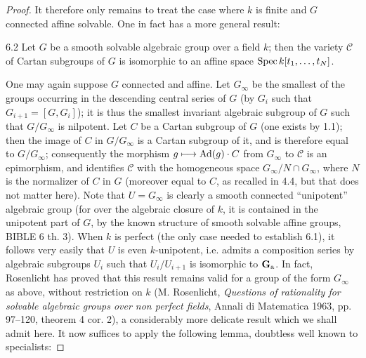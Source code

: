 \begin{proof}
It therefore only remains to treat the
case where $k$ is finite and $G$
connected affine solvable. One in
fact has a more general result:
\begin{corollary}{6.2}\label{XIV.6.2}
Let $G$ be a smooth solvable
algebraic group over a field $k$;
then the variety $\mathscr C$ of
Cartan subgroups of $G$ is
isomorphic to an affine space
$\operatorname{Spec} k[t_1,\ldots,t_N]$.
\end{corollary}
One may again suppose $G$ connected
and affine. Let $G_\infty$ be the
smallest of the groups occurring
in the descending central series
of $G$ (by $G_i$ such that
$G_{i+1}=[G,G_i]$); it is thus
the smallest invariant algebraic
subgroup of $G$ such that
$G/G_\infty$ is nilpotent.
Let $C$ be a Cartan subgroup of
$G$ (one exists by 1.1); then
the image of $C$ in $G/G_\infty$
is a Cartan subgroup of it,
and is therefore equal to
$G/G_\infty$; consequently the
morphism $g\longmapsto\operatorname{Ad}(g)\cdot C$
from $G_\infty$ to $\mathscr C$
is an epimorphism, and identifies
$\mathscr C$ with the homogeneous
space $G_\infty/N\cap G_\infty$,
where $N$ is the normalizer
of $C$ in $G$ (moreover equal
to $C$, as recalled in 4.4,
but that does not matter here).
Note that $U=G_\infty$ is
clearly a smooth connected
``unipotent'' algebraic group
(for over the algebraic closure
of $k$, it is contained in
the unipotent part of $G$,
by the known structure of
smooth solvable affine groups,
BIBLE 6 th. 3). When $k$ is
perfect (the only case needed
to establish 6.1), it follows
very easily that $U$ is even
$k$-unipotent, i.e. admits a
composition series by algebraic
subgroups $U_i$ such that
$U_i/U_{i+1}$ is isomorphic
to $\mathbf{G}_{\mathrm{a}}$. In fact, Rosenlicht
has proved that this result
remains valid for a group
of the form $G_\infty$ as
above, without restriction
on $k$ (M. Rosenlicht,
\emph{Questions of rationality
for solvable algebraic groups
over non perfect fields},
Annali di Matematica 1963,
pp. 97--120, theorem 4 cor. 2),
a considerably more delicate
result which we shall admit
here. It now suffices to
apply the following lemma,
doubtless well known to
specialists:


\end{proof}
